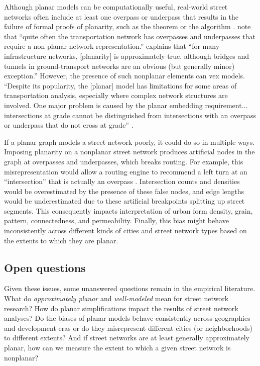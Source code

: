 \documentclass[Afour,doublespace,sageh,times]{sagej}
\begin{document}
Although planar models can be computationally useful, real-world street networks often include at least one overpass or underpass that results in the failure of formal proofs of planarity, such as the \citet{kuratowski_sur_1930} theorem or the \cite{hopcroft_efficient_1974} algorithm \citep[cf.][]{gastner_spatial_2006,levinson_network_2012}. \citet[p.~199]{jiang_object-oriented_2010} note that \enquote{quite often the transportation network has overpasses and underpasses that require a non-planar network representation.} \citet[p.~1258]{fischer_spatial_2014} explains that \enquote{for many infrastructure networks, {[planarity]} is approximately true, although bridges and tunnels in ground-transport networks are an obvious (but generally minor) exception.} However, the presence of such nonplanar elements can vex models. \enquote{Despite its popularity, the [planar] model has limitations for some areas of transportation analysis, especially where complex network structures are involved. One major problem is caused by the planar embedding requirement... intersections at grade cannot be distinguished from intersections with an overpass or underpass that do not cross at grade} \citep[p.~395]{fischer_gis_2004}.

If a planar graph models a street network poorly, it could do so in multiple ways. Imposing planarity on a nonplanar street network produces artificial nodes in the graph at overpasses and underpasses, which breaks routing. For example, this misrepresentation would allow a routing engine to recommend a left turn at an \enquote{intersection} that is actually an overpass \citep[p.~6]{kwan_review_1996}. Intersection counts and densities would be overestimated by the presence of these false nodes, and edge lengths would be underestimated due to these artificial breakpoints splitting up street segments. This consequently impacts interpretation of urban form density, grain, pattern, connectedness, and permeability. Finally, this bias might behave inconsistently across different kinds of cities and street network types based on the extents to which they are planar.

\subsection{Open questions}

Given these issues, some unanswered questions remain in the empirical literature. What do \emph{approximately planar} and \emph{well-modeled} mean for street network research? How do planar simplifications impact the results of street network analyses? Do the biases of planar models behave consistently across geographies and development eras or do they misrepresent different cities (or neighborhoods) to different extents? And if street networks are at least generally approximately planar, how can we measure the extent to which a given street network is nonplanar?
\end{document}
